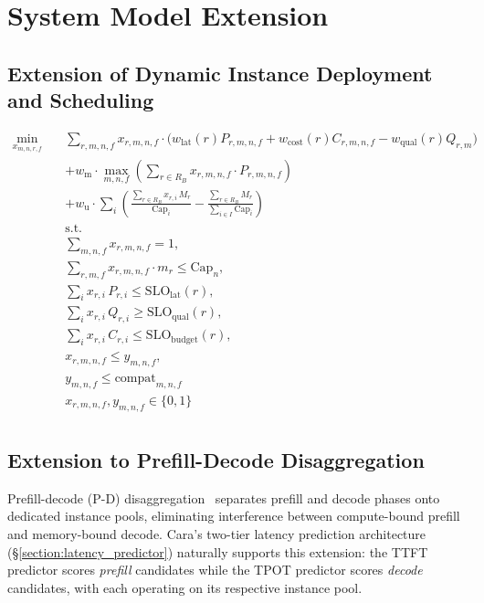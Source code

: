 \documentclass[letterpaper, anonymous, twocolumn, 10pt]{article}
\begin{document}
{



\appendix
\section{System Model Extension}
\subsection{Extension of Dynamic Instance Deployment and Scheduling} \label{append:dynamic-scheduling}
\begin{equation}
\begin{aligned}
\min_{x_{m, n, r,f}} \quad & \sum_{r,m,n,f} x_{r,m,n,f} \cdot \Big(w_{\text{lat}}(r) P_{r,m,n,f} + w_{\text{cost}}(r) C_{r,m,n,f} - w_{\text{qual}}(r) Q_{r,m} \Big) \nonumber \\
& + w_{\text{m}} \cdot \max_{m,n,f} \left( \sum_{r \in R_B} x_{r,m,n,f} \cdot P_{r,m,n,f} \right) \nonumber \\
& + w_{\text{u}} \cdot \sum_i\left( \frac{\sum_{r\in R_B} x_{r,i} \, M_r}{\mathrm{Cap}_i} - \frac{\sum_{r \in R_B} M_r}{\sum_{i \in I} \mathrm{Cap}_i}\right) \\
& \text{s.t.} \\
& \sum_{m,n,f} x_{r,m,n,f} = 1,\\
& \sum_{r,m,f} x_{r,m,n,f} \cdot m_r \le \text{Cap}_n,  \nonumber \\
& \sum_{i} x_{r,i} \, P_{r,i} \le \mathrm{SLO}_{\text{lat}}(r), \nonumber\\
& \sum_{i} x_{r,i} \, Q_{r,i} \ge \mathrm{SLO}_{\text{qual}}(r), \nonumber\\
& \sum_{i} x_{r,i} \, C_{r,i} \le \mathrm{SLO}_{\text{budget}}(r), \nonumber\\
& x_{r,m,n,f} \le y_{m,n,f}, \nonumber \\
& y_{m,n,f} \le \text{compat}_{m,n,f} \nonumber \\
& x_{r,m,n,f}, y_{m,n,f} \in \{0,1\}\\
\end{aligned}
\end{equation}

\subsection{Extension to Prefill-Decode Disaggregation} \label{appendix:pd}

Prefill-decode (P-D) disaggregation~\cite{zhong2024distservedisaggregatingprefilldecoding} separates prefill and decode phases onto dedicated instance pools, eliminating interference between compute-bound prefill and memory-bound decode.
Cara's two-tier latency prediction architecture (\S\ref{section:latency_predictor}) naturally supports this extension: the TTFT predictor scores \emph{prefill} candidates while the TPOT predictor scores \emph{decode} candidates, with each operating on its respective instance pool.

}
\end{document}
